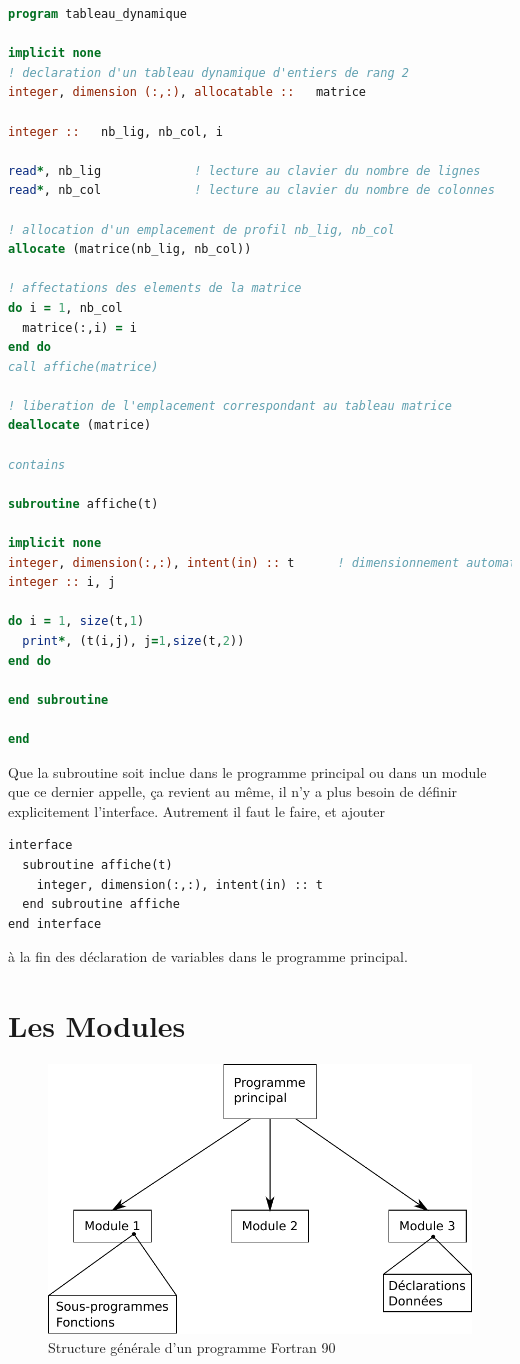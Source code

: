 \documentclass[a4paper,twoside]{article}
\begin{document}
\begin{lstlisting}[language=Fortran]
program tableau_dynamique
 
implicit none 
! declaration d'un tableau dynamique d'entiers de rang 2 
integer, dimension (:,:), allocatable ::   matrice

integer ::   nb_lig, nb_col, i

read*, nb_lig             ! lecture au clavier du nombre de lignes
read*, nb_col             ! lecture au clavier du nombre de colonnes

! allocation d'un emplacement de profil nb_lig, nb_col
allocate (matrice(nb_lig, nb_col))    

! affectations des elements de la matrice 
do i = 1, nb_col
  matrice(:,i) = i
end do
call affiche(matrice)

! liberation de l'emplacement correspondant au tableau matrice 
deallocate (matrice) 

contains

subroutine affiche(t)
 
implicit none 
integer, dimension(:,:), intent(in) :: t      ! dimensionnement automatique
integer :: i, j 

do i = 1, size(t,1) 
  print*, (t(i,j), j=1,size(t,2))
end do

end subroutine

end 

\end{lstlisting}
Que la subroutine soit inclue dans le programme principal ou dans un module que ce dernier appelle, ça revient au même, il n'y a plus besoin de définir explicitement l'interface. Autrement il faut le faire, et ajouter
\begin{verbatim}
interface 
  subroutine affiche(t) 
    integer, dimension(:,:), intent(in) :: t 
  end subroutine affiche 
end interface 
\end{verbatim}
à la fin des déclaration de variables dans le programme principal.

\section{Les Modules}

\begin{figure}[htb]
\centering
\includegraphics[width=0.65\linewidth]{figure/structure_programme.pdf}
\caption{Structure générale d'un programme Fortran 90}\label{fig:structure_programme}
\end{figure}
\end{document}
